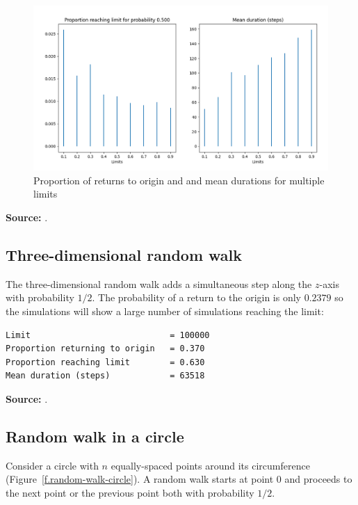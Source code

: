 \documentclass[11pt,a4paper]{article}
\begin{document}
\begin{figure}
\begin{center}
\includegraphics[width=\textwidth]{random-walk-02}
\caption{Proportion of returns to origin and and mean durations for multiple limits}\label{f.random-walk-2D}
\end{center}
\end{figure}

\textbf{Source:} \cite[Problem 51]{mosteller,mos}.

\subsection{Three-dimensional random walk}

The three-dimensional random walk adds a simultaneous step along the $z$-axis with probability $1/2$. The probability of a return to the origin is only $0.2379$ so the simulations will show a large number of simulations reaching the limit:

\newpage

\begin{verbatim}
Limit                            = 100000
Proportion returning to origin   = 0.370
Proportion reaching limit        = 0.630
Mean duration (steps)            = 63518
\end{verbatim}

\textbf{Source:} \cite[Problem 52]{mosteller,mos}.

\subsection{Random walk in a circle}

Consider a circle with $n$ equally-spaced points around its circumference (Figure~\ref{f.random-walk-circle}). A random walk starts at point $0$ and proceeds to the next point or the previous point both with probability $1/2$.
\end{document}
